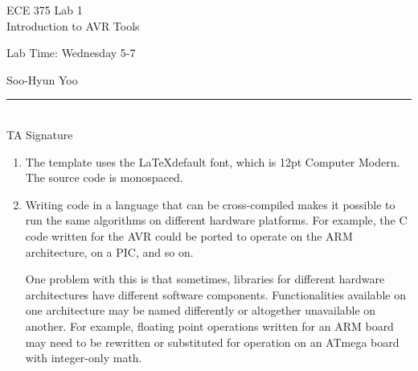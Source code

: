 \documentclass[12pt,letterpaper]{article}
\begin{document}
\begin{titlepage}
    \vspace*{4cm}
    \begin{flushright}
    {\huge
        ECE 375 Lab 1\\[1cm]
    }
    {\large
        Introduction to AVR Tools
    }
    \end{flushright}
    \begin{flushleft}
    Lab Time: Wednesday 5-7
    \end{flushleft}
    \begin{flushright}
    Soo-Hyun Yoo

    \vfill
    \rule{5in}{.5mm}\\
    TA Signature
    \end{flushright}

\end{titlepage}

\begin{enumerate}
	\item The template uses the \LaTeX default font, which is 12pt Computer
		Modern. The source code is monospaced.
	\item Writing code in a language that can be cross-compiled makes it
		possible to run the same algorithms on different hardware platforms.
		For example, the C code written for the AVR could be ported to operate
		on the ARM architecture, on a PIC, and so on.

		One problem with this is that sometimes, libraries for different
		hardware architectures have different software components.
		Functionalities available on one architecture may be named differently
		or altogether unavailable on another. For example, floating point
		operations written for an ARM board may need to be rewritten or
		substituted for operation on an ATmega board with integer-only math.
\end{enumerate}
\end{document}
